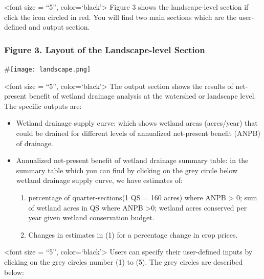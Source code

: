 \documentclass[
]{article}
\providecommand{\tightlist}{%
  \setlength{\itemsep}{0pt}\setlength{\parskip}{0pt}}
\begin{document}
\textless font size = ``5'', color=`black'\textgreater{} Figure 3 shows
the landscape-level section if click the icon circled in red. You will
find two main sections which are the user-defined and output section.

\hypertarget{figure-3.-layout-of-the-landscape-level-section}{%
\subsubsection{\texorpdfstring{ Figure 3. Layout of the Landscape-level
Section
}{ Figure 3. Layout of the Landscape-level Section }}\label{figure-3.-layout-of-the-landscape-level-section}}

\#\texttt{[image: landscape.png]}

\textless font size = ``5'', color=`black'\textgreater{} The output
section shows the results of net-present benefit of wetland drainage
analysis at the watershed or landscape level. The specific outputs are:

\begin{itemize}
\tightlist
\item
  Wetland drainage supply curve: which shows wetland areas (acres/year)
  that could be drained for different levels of annualized net-present
  benefit (ANPB) of drainage.
\item
  Annualized net-present benefit of wetland drainage summary table: in
  the summary table which you can find by clicking on the grey circle
  below wetland drainage supply curve, we have estimates of:

  \begin{enumerate}
  \def\labelenumi{(\arabic{enumi})}
  \tightlist
  \item
    percentage of quarter-sections(1 QS = 160 acres) where ANPB
    \textgreater{} 0; sum of wetland acres in QS where ANPB
    \textgreater0; wetland acres conserved per year given wetland
    conservation budget.
  \item
    Changes in estimates in (1) for a percentage change in crop prices.
  \end{enumerate}
\end{itemize}

\textless font size = ``5'', color=`black'\textgreater{} Users can
specify their user-defined inputs by clicking on the grey circles number
(1) to (5). The grey circles are described below:
\end{document}
